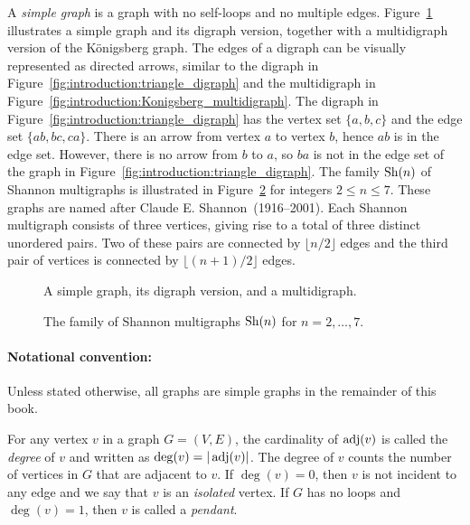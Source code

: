 A \emph{simple graph} is a
graph with no self-loops and no multiple edges.
Figure~\ref{fig:introduction:simple_graph_digraph_multidigraph}
illustrates a simple graph and its digraph version, together with a
multidigraph version of the K\"onigsberg graph. The edges of a digraph
can be visually represented as directed arrows, similar to the digraph
in
Figure~\ref{fig:introduction:triangle_digraph} and the multidigraph in
Figure~\ref{fig:introduction:Konigsberg_multidigraph}. The digraph in
Figure~\ref{fig:introduction:triangle_digraph} has the vertex set
$\{a, b, c\}$ and the edge set $\{ab, bc, ca\}$. There is an arrow
from vertex $a$ to vertex $b$, hence $ab$ is in the edge set. However,
there is no arrow from $b$ to $a$, so $ba$ is not in the edge set of
the graph in Figure~\ref{fig:introduction:triangle_digraph}. The
family $\operatorname*{Sh}(n)$ of Shannon multigraphs is illustrated in
Figure~\ref{fig:introduction:Shannon_multigraphs} for integers
$2 \leq n \leq 7$. These graphs are named after Claude
E. Shannon~(1916--2001). Each Shannon multigraph consists of three
vertices, giving rise to a total of three distinct unordered
pairs. Two of these pairs are connected by $\lfloor n/2 \rfloor$
edges and the third pair of vertices is connected by
$\lfloor (n + 1) / 2 \rfloor$ edges.

\begin{figure}[!htbp]
\centering

\caption{A simple graph, its digraph version, and a multidigraph.}
\label{fig:introduction:simple_graph_digraph_multidigraph}
\end{figure}

\begin{figure}[!htbp]
\centering

\caption{The family of Shannon multigraphs $\operatorname*{Sh}(n)$ for $n = 2,\dots,7$.}
\label{fig:introduction:Shannon_multigraphs}
\end{figure}

\paragraph{Notational convention:}
Unless stated otherwise, all graphs are simple graphs in the remainder
of this book.

\begin{definition}
\rm
For any vertex $v$ in a graph $G = (V, E)$, the
cardinality of $\operatorname*{adj}(v)$ is called the
\emph{degree} of $v$ and written as
$\deg(v) = |\operatorname*{adj}(v)|$\index{$\deg$}. The degree of $v$ counts the
number of vertices in $G$ that are adjacent to $v$. If $\deg(v) = 0$,
then $v$ is not incident to any edge and we say that $v$ is an
\emph{isolated} vertex. If $G$ has no loops
and $\deg(v) = 1$, then $v$ is called a
\emph{pendant}.
\end{definition}

